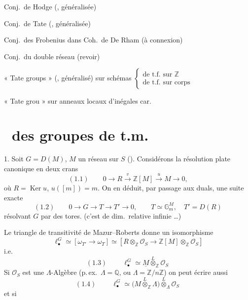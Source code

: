 \documentclass[11pt,a4paper]{article}
\begin{document}
Conj.\ de Hodge (\ill{}, généralisée)

Conj.\ de Tate (\ill{}, généralisée)

Conj.\ des Frobenius dans Coh.\ de De Rham (à connexion)

Conj.\ du double réseau (revoir)

« Tate groups » (\ill{}, généralisé) sur schémas
$\begin{cases} \text{de t.f.\ sur } \mathbb{Z} \\ \text{de t.f.\ sur corps} \end{cases}$

« Tate grou » sur anneaux locaux d'inégales car.



\section*{\ des groupes de t.m.}

1. \quad Soit $G = D(M)$, $M$ un réseau sur $S$ (). Considérons la résolution plate canonique en deux crans
\[
(1.1) \qquad 0 \longrightarrow R \xrightarrow{\ v\ } \mathbb{Z}[M] \xrightarrow{\ u\ } M \longrightarrow 0 ,
\]
où $R = \operatorname{Ker} u$, $u([m]) = m$. On en déduit, par passage aux
duals, une suite exacte
\[
(1.2) \qquad 0 \to G \to T \to T' \to 0, \qquad T \simeq \mathbb{G}_m^{M}, \quad T' = D(R)
\]
résolvant $G$ par des tores. (c'est de dim.\ relative infinie \ldots)

Le triangle de transitivité de Mazur--Roberts donne un isomorphisme \struck{\ill{}}
\[
\ell^{G}_\bullet \simeq [\omega_{T'} \to \omega_T] \simeq [R \otimes_{\mathbb{Z}} \mathcal{O}_S \to \mathbb{Z}[M] \otimes_{\mathbb{Z}} \mathcal{O}_S]
\]
i.e.
\[
(1.3) \qquad \boxed{\ \ell^{G}_\bullet \simeq \underline{M} \overset{L}{\otimes}_{\mathbb{Z}} \mathcal{O}_S\ }
\]
Si \struck{\ill{}} $\mathcal{O}_S$ est une $\Lambda$-Algèbre (p.\,ex.\
$\Lambda = \mathbb{Q}$, ou $\Lambda = \mathbb{Z}/n\mathbb{Z}$)
 on peut écrire aussi
\[
(1.4) \qquad \boxed{\ \ell^{G}_\bullet \simeq \bigl(M \overset{L}{\otimes}_{\mathbb{Z}} \Lambda\bigr) \overset{L}{\otimes}_{\Lambda} \mathcal{O}_S\ }
\]
et si
\end{document}
